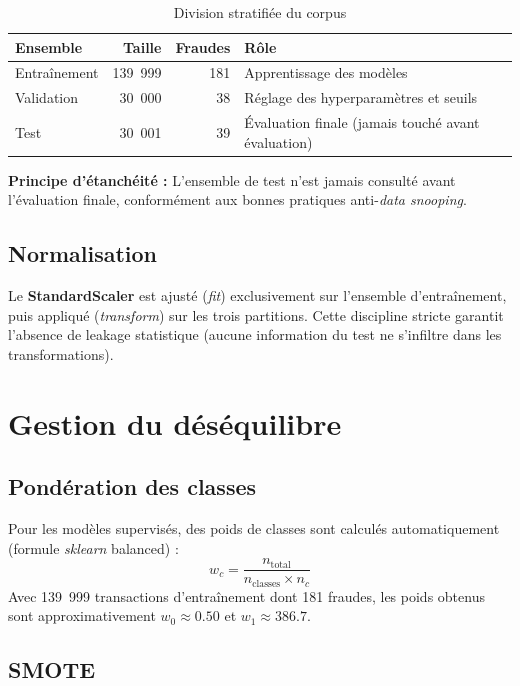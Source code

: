 \documentclass[12pt,a4paper,twoside]{report}
\begin{document}
\begin{table}[H]
\centering
\caption{Division stratifiée du corpus}
\label{tab:splits}
\begin{tabular}{lrrl}
\toprule
\textbf{Ensemble} & \textbf{Taille} & \textbf{Fraudes} & \textbf{Rôle} \\
\midrule
Entraînement  & 139~999 & 181 & Apprentissage des modèles \\
Validation    & 30~000  & 38  & Réglage des hyperparamètres et seuils \\
Test          & 30~001  & 39  & Évaluation finale (jamais touché avant évaluation) \\
\bottomrule
\end{tabular}
\end{table}

\textbf{Principe d'étanchéité :} L'ensemble de test n'est jamais consulté avant l'évaluation finale, conformément aux bonnes pratiques anti-\textit{data snooping}.

\subsection{Normalisation}

Le \textbf{StandardScaler} est ajusté (\textit{fit}) exclusivement sur l'ensemble d'entraînement, puis appliqué (\textit{transform}) sur les trois partitions. Cette discipline stricte garantit l'absence de leakage statistique (aucune information du test ne s'infiltre dans les transformations).

\section{Gestion du déséquilibre}

\subsection{Pondération des classes}

Pour les modèles supervisés, des poids de classes sont calculés automatiquement (formule \textit{sklearn} balanced) :
\[
w_c = \frac{n_{\text{total}}}{n_{\text{classes}} \times n_c}
\]
Avec 139~999 transactions d'entraînement dont 181 fraudes, les poids obtenus sont approximativement $w_0 \approx 0.50$ et $w_1 \approx 386.7$.

\subsection{SMOTE}
\end{document}
